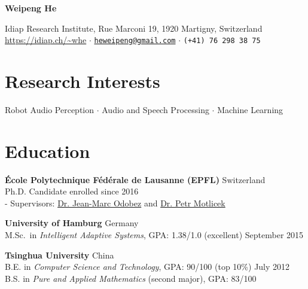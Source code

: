 \documentclass[a4paper,9pt]{extarticle} %
\newcommand{\ind}{\hspace*{1em}}
\begin{document}
\thispagestyle{empty}


\begin{center}
  {\Huge\bfseries\sffamily Weipeng He}

  \sffamily Idiap Research Institute, Rue Marconi 19, 1920 Martigny, Switzerland \\
  \url{https://idiap.ch/~whe} $\cdotp$
  \href{mailto:heweipeng@gmail.com}{\texttt{heweipeng@gmail.com}} $\cdotp$
  \texttt{(+41) 76 298 38 75}
\end{center}


\section{Research Interests}
\begin{center}
Robot Audio Perception $\cdotp$ Audio and Speech Processing $\cdotp$ Machine Learning
\end{center}


\section{Education}
\textbf{\'Ecole Polytechnique F\'ed\'erale de Lausanne (EPFL)} \hfill Switzerland \\
\ind{} Ph.D. Candidate \hfill enrolled since 2016 \\
\ind{} - Supervisors: \href{https://idiap.ch/~odobez}{Dr. Jean-Marc Odobez} and \href{https://people.idiap.ch/pmotlic}{Dr. Petr Motlicek}

\textbf{University of Hamburg} \hfill Germany \\
\ind{} M.Sc.\ in \textit{Intelligent Adaptive Systems}, GPA\@: 1.38/1.0 (excellent)  \hfill September 2015%

\textbf{Tsinghua University} \hfill China \\
\ind{} B.E. in \textit{Computer Science and Technology}, GPA\@: 90/100 (top 10\%) \hfill July 2012 \\
\ind{} B.S. in \textit{Pure and Applied Mathematics} (second major), GPA\@: 83/100 %
\end{document}
